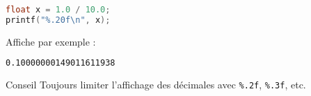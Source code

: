 \begin{lstlisting}[language=c]
float x = 1.0 / 10.0;
printf("%.20f\n", x);
\end{lstlisting}

Affiche par exemple :
\begin{lstlisting}[language=bash,style=console]
0.10000000149011611938
\end{lstlisting}

\begin{UPSTIinfor}{Conseil}
	Toujours limiter l’affichage des décimales avec \texttt{\%.2f}, \texttt{\%.3f}, etc.
\end{UPSTIinfor}